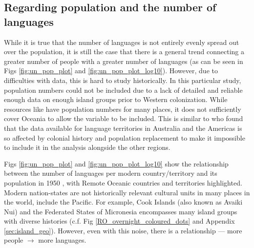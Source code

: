 \documentclass[unnumsec,webpdf,modern,medium]{oup-authoring-template}
\begin{document}
\begin{appendices}
\section{Regarding population and the number of languages}
\label{appendix_pop_vs_languages}
While it is true that the number of languages is not entirely evenly spread out over the population, it is still the case that there is a general trend connecting a greater number of people with a greater number of languages (as can be seen in Figs \ref{fig:un_pop_plot} and \ref{fig:un_pop_plot_log10}). However, due to difficulties with data, this is hard to study historically. In this particular study, population numbers could not be included due to a lack of detailed and reliable enough data on enough island groups prior to Western colonization. While resources like \citet{elcat} have population numbers for many places, it does not sufficiently cover Oceania to allow the variable to be included. This is similar to \citet[7340-7341]{curriemace2009} who found that the data available for language territories in Australia and the Americas is so affected by colonial history and population replacement to make it impossible to include it in the analysis alongside the other regions. 

Figs \ref{fig:un_pop_plot} and \ref{fig:un_pop_plot_log10} show the relationship between the number of languages per modern country/territory \citep{glottolog4_5} and its population in 1950 \citep{UN_pop}, with Remote Oceanic countries and territories highlighted. Modern nation-states are not historically relevant cultural units in many places in the world, include the Pacific. For example, Cook Islands (also known as Avaiki Nui) and the Federated States of Micronesia encompasses many island groups with diverse histories (c.f. Fig \ref{RO_overnight_coloured_dots} and Appendix \ref{sec:island_geo}). However, even with this noise, there is a relationship --- more people $\rightarrow$ more languages.


\end{appendices}
\end{document}
